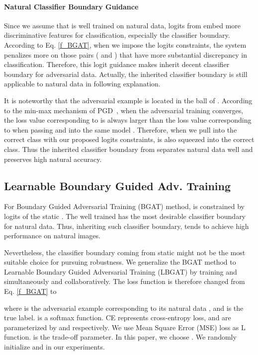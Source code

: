 \documentclass[10pt,twocolumn,letterpaper]{article}
\begin{document}
\paragraph{Natural Classifier Boundary Guidance} 
Since we assume that  is well trained on natural data, logits from  embed more discriminative features for classification, especially the classifier boundary. According to Eq. \eqref{f_BGAT}, when we impose the logits constraints, the system penalizes more on those pairs ( and ) that have more substantial discrepancy in classification. Therefore, this logit guidance makes  inherit decent classifier boundary for adversarial data. Actually, the inherited classifier boundary is still applicable to natural data in following explanation.

It is noteworthy that the adversarial example  is located in the  ball of . According to the min-max mechanism of PGD~\cite{DBLP:conf/iclr/MadryMSTV18}, when the adversarial training converges, the loss value corresponding to  is always larger than the loss value corresponding to  when passing  and  into the same model . Therefore, when we pull  into the correct class with our proposed logits constraints,  is also squeezed into the correct class. Thus the inherited classifier boundary from  separates natural data well and preserves high natural accuracy. 

\subsection{Learnable Boundary Guided Adv. Training}
\label{sec_LBGAT}
For Boundary Guided Adversarial Training (BGAT) method,  is constrained by logits of the static . The well trained  has the most desirable classifier boundary for natural data. Thus, inheriting such classifier boundary,  tends to achieve high performance on natural images. 

Nevertheless, the classifier boundary coming from static  might not be the most suitable choice for pursuing robustness.
We generalize the BGAT method to Learnable Boundary Guided Adversarial Training (LBGAT) by training  and  simultaneously and collaboratively. The loss function is therefore changed from Eq. \eqref{f_BGAT} to
\begin{small}
	
\end{small}
where  is the adversarial example corresponding to its natural data , and  is the true label.  is a softmax function. CE represents cross-entropy loss,  and  are parameterized by  and  respectively. We use Mean Square Error (MSE) loss as L function.  is the trade-off parameter. In this paper, we choose . We randomly initialize  and  in our experiments.
\end{document}
